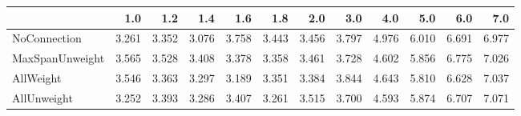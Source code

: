 \begin{tabular}{lrrrrrrrrrrr}
\toprule
{} &   1.0 &   1.2 &   1.4 &   1.6 &   1.8 &   2.0 &   3.0 &   4.0 &   5.0 &   6.0 &   7.0 \\
\midrule
NoConnection    & 3.261 & 3.352 & 3.076 & 3.758 & 3.443 & 3.456 & 3.797 & 4.976 & 6.010 & 6.691 & 6.977 \\
MaxSpanUnweight & 3.565 & 3.528 & 3.408 & 3.378 & 3.358 & 3.461 & 3.728 & 4.602 & 5.856 & 6.775 & 7.026 \\
AllWeight       & 3.546 & 3.363 & 3.297 & 3.189 & 3.351 & 3.384 & 3.844 & 4.643 & 5.810 & 6.628 & 7.037 \\
AllUnweight     & 3.252 & 3.393 & 3.286 & 3.407 & 3.261 & 3.515 & 3.700 & 4.593 & 5.874 & 6.707 & 7.071 \\
\bottomrule
\end{tabular}
